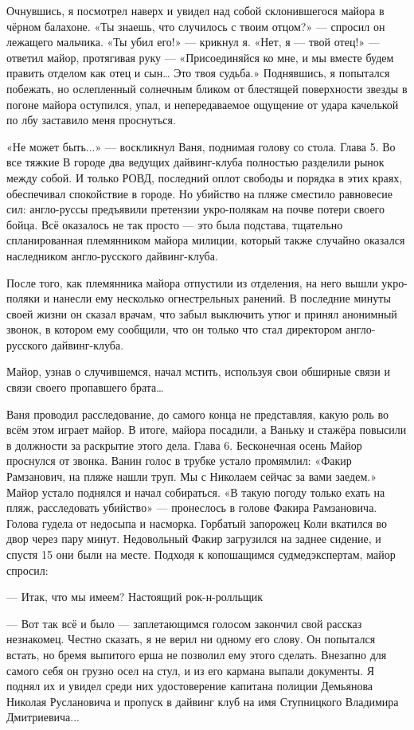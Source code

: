 Очнувшись, я посмотрел наверх и увидел над собой склонившегося майора в чёрном балахоне. «Ты знаешь, что случилось с твоим отцом?» --- спросил он лежащего мальчика. «Ты убил его!» --- крикнул я. «Нет, я --- твой отец!» --- ответил майор, протягивая руку --- «Присоединяйся ко мне, и мы вместе будем править отделом как отец и сын… Это твоя судьба.» Поднявшись, я попытался побежать, но ослепленный солнечным бликом от блестящей поверхности звезды в погоне майора оступился, упал, и непередаваемое ощущение от удара качелькой по лбу заставило меня проснуться.


«Не может быть...» --- воскликнул Ваня, поднимая голову со стола.
Глава 5. Во все тяжкие
В городе два ведущих дайвинг-клуба полностью разделили рынок между собой. И только РОВД, последний оплот свободы и порядка в этих краях, обеспечивал спокойствие в городе. Но убийство на пляже сместило равновесие сил: англо-руссы предъявили претензии укро-полякам на почве потери своего бойца. Всё оказалось не так просто --- это была подстава, тщательно спланированная племянником майора милиции, который также случайно оказался наследником англо-русского дайвинг-клуба.


После того, как племянника майора отпустили из отделения, на него вышли укро-поляки и нанесли ему несколько огнестрельных ранений. В последние минуты своей жизни он сказал врачам, что забыл выключить утюг и принял анонимный звонок, в котором ему сообщили, что он только что стал директором англо-русского дайвинг-клуба.


Майор, узнав о случившемся, начал мстить, используя свои обширные связи и связи своего пропавшего брата…


Ваня проводил расследование, до самого конца не представляя, какую роль во всём этом играет майор. В итоге, майора посадили, а Ваньку и стажёра повысили в должности за раскрытие этого дела.
Глава 6. Бесконечная осень
Майор проснулся от звонка. Ванин голос в трубке устало промямлил: «Факир Рамзанович, на пляже нашли труп. Мы с Николаем сейчас за вами заедем.» Майор устало поднялся и начал собираться. «В такую погоду только ехать на пляж, расследовать убийство» --- пронеслось в голове Факира Рамзановича. Голова гудела от недосыпа и насморка. Горбатый запорожец Коли вкатился во двор через пару минут. Недовольный Факир загрузился на заднее сидение, и спустя 15 они были на месте. Подходя к копошащимся судмедэкспертам, майор спросил:



--- Итак, что мы имеем?
Настоящий рок-н-ролльщик

--- Вот так всё и было --- заплетающимся голосом закончил свой рассказ незнакомец. Честно сказать, я не верил ни одному его слову. Он попытался встать, но бремя выпитого ерша не позволил ему этого сделать. Внезапно для самого себя он грузно осел на стул, и из его кармана выпали документы. Я поднял их и увидел среди них удостоверение капитана полиции Демьянова Николая Руслановича и пропуск в дайвинг клуб на имя Ступницкого Владимира Дмитриевича...